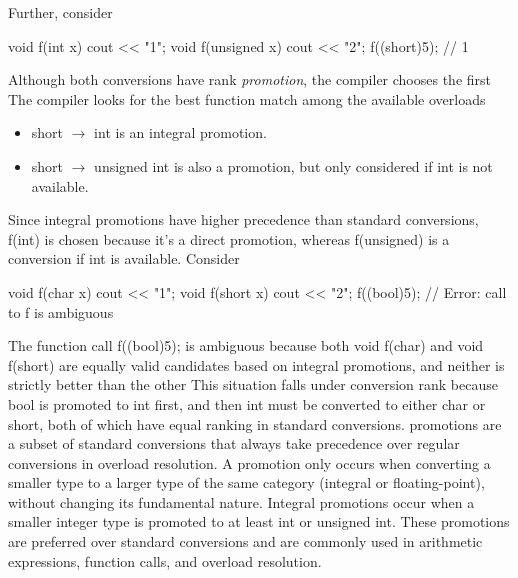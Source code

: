 \documentclass{report}
\begin{document}
    \bigbreak \noindent 
    Further, consider
    \bigbreak \noindent 
    \begin{cppcode}
        void f(int x) { cout << "1"; }
        void f(unsigned x) { cout << "2"; } 
        f((short)5); // 1
    \end{cppcode}
    \bigbreak \noindent 
    Although both conversions have rank \textit{promotion}, the compiler  chooses the first
    \bigbreak \noindent 
    The compiler looks for the best function match among the available overloads
    \bigbreak \noindent 
    \begin{itemize}
        \item short $\to$ int is an integral promotion.
        \item short $\to$ unsigned int is also a promotion, but only considered if int is not available.
    \end{itemize}
    Since integral promotions have higher precedence than standard conversions, f(int) is chosen because it's a direct promotion, whereas f(unsigned) is a conversion if int is available.
    \bigbreak \noindent 
    Consider
    \bigbreak \noindent 
    \begin{cppcode}
        void f(char x) { cout << "1"; }
        void f(short x) { cout << "2"; }
        f((bool)5); // Error: call to f is ambiguous
    \end{cppcode}
    \bigbreak \noindent 
    The function call f((bool)5); is ambiguous because both void f(char) and void f(short) are equally valid candidates based on integral promotions, and neither is strictly better than the other
    \bigbreak \noindent 
    This situation falls under conversion rank because bool is promoted to int first, and then int must be converted to either char or short, both of which have equal ranking in standard conversions.
    \bigbreak \noindent 
    promotions are a subset of standard conversions that always take precedence over regular conversions in overload resolution. A promotion only occurs when converting a smaller type to a larger type of the same category (integral or floating-point), without changing its fundamental nature.
    \bigbreak \noindent 
    Integral promotions occur when a smaller integer type is promoted to at least int or unsigned int. These promotions are preferred over standard conversions and are commonly used in arithmetic expressions, function calls, and overload resolution.
\end{document}
